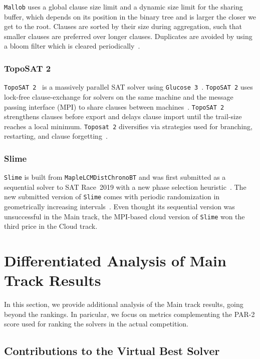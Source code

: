 \documentclass{elsarticle}
\newcommand{\solver}[1]{\texttt{#1}}
\begin{document}
\solver{Mallob} uses a global clause size limit and a dynamic size limit for the sharing buffer, which depends on its position in the binary tree and is larger the closer we get to the root. 
Clauses are sorted by their size during aggregation, such that smaller clauses are preferred over longer clauses. 
Duplicates are avoided by using a bloom filter which is cleared periodically~\cite{Schreiber:SC2020}. 


\subsubsection{TopoSAT 2}

\solver{TopoSAT~2}~\cite{Ehlers:2018:Toposat2} is a massively parallel SAT solver using \solver{Glucose~3}~\cite{Audemard:2018:Glucose}. 
\solver{TopoSAT~2} uses lock-free clause-exchange for solvers on the same machine and the message passing interface (MPI) to share clauses between machines~\cite{Hamadi:2009:ManySat}. 
\solver{TopoSAT~2} strengthens clauses before export and delays clause import until the trail-size reaches a local minimum. 
\solver{Toposat~2} diversifies via strategies used for branching, restarting, and clause forgetting~\cite{Ehlers:SC2020}. 


\subsubsection{Slime}

\solver{Slime} is built from \solver{MapleLCMDistChronoBT} and was first submitted as a sequential solver to SAT Race~2019 with a new phase selection heuristic~\cite{Riveros:SC2019}. 
The new submitted version of \solver{Slime} comes with periodic randomization in geometrically increasing intervals~\cite{Riveros:SC2020}. 
Even thought its sequential version was unsuccessful in the Main track, the MPI-based cloud version of \solver{Slime} won the third price in the Cloud track. 


\section{Differentiated Analysis of Main Track Results}
\label{sec:analysis}

In this section, we provide additional analysis of the Main track results, going beyond the rankings.
In paricular, we focus on metrics complementing the PAR-2 score used for ranking the solvers in the actual competition.

\subsection{Contributions to the Virtual Best Solver}
\end{document}
